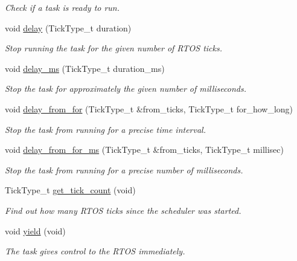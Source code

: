 \begin{DoxyCompactItemize}
\begin{DoxyCompactList}\small\item\em Check if a task is ready to run. \end{DoxyCompactList}\item 
void \mbox{\hyperlink{class_task_base_a06d9c962cc578a84a69ca637f6d5adef}{delay}} (Tick\+Type\+\_\+t duration)
\begin{DoxyCompactList}\small\item\em Stop running the task for the given number of R\+T\+OS ticks. \end{DoxyCompactList}\item 
void \mbox{\hyperlink{class_task_base_a6a7e9bc3d85a0e71462002b85402d995}{delay\+\_\+ms}} (Tick\+Type\+\_\+t duration\+\_\+ms)
\begin{DoxyCompactList}\small\item\em Stop the task for approximately the given number of milliseconds. \end{DoxyCompactList}\item 
void \mbox{\hyperlink{class_task_base_adc48db72592a8b34ca1235e1d18604cc}{delay\+\_\+from\+\_\+for}} (Tick\+Type\+\_\+t \&from\+\_\+ticks, Tick\+Type\+\_\+t for\+\_\+how\+\_\+long)
\begin{DoxyCompactList}\small\item\em Stop the task from running for a precise time interval. \end{DoxyCompactList}\item 
void \mbox{\hyperlink{class_task_base_a31b1c01059c7ec4bfe60fc8332759551}{delay\+\_\+from\+\_\+for\+\_\+ms}} (Tick\+Type\+\_\+t \&from\+\_\+ticks, Tick\+Type\+\_\+t millisec)
\begin{DoxyCompactList}\small\item\em Stop the task from running for a precise number of milliseconds. \end{DoxyCompactList}\item 
Tick\+Type\+\_\+t \mbox{\hyperlink{class_task_base_aea05d3d35f6cbda823ed4812b0951944}{get\+\_\+tick\+\_\+count}} (void)
\begin{DoxyCompactList}\small\item\em Find out how many R\+T\+OS ticks since the scheduler was started. \end{DoxyCompactList}\item 
void \mbox{\hyperlink{class_task_base_a4e9fe49dbbf245e182abf6d17c9bd3df}{yield}} (void)
\begin{DoxyCompactList}\small\item\em The task gives control to the R\+T\+OS immediately. \end{DoxyCompactList}\item 

\end{DoxyCompactItemize}
